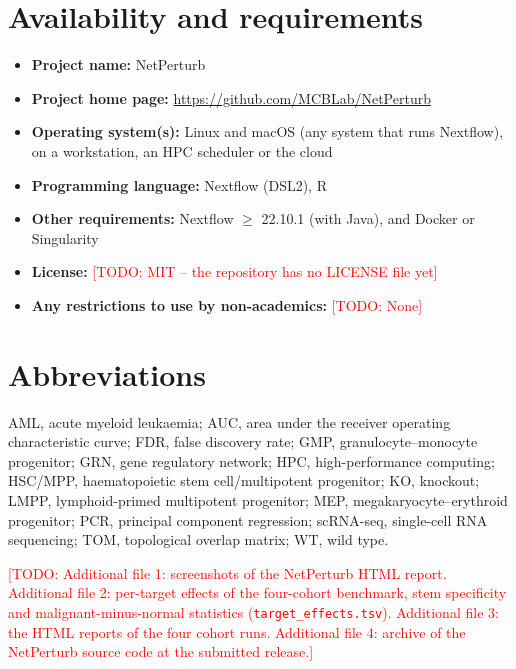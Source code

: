 \documentclass[pdflatex,sn-vancouver-num]{sn-jnl}%
\newcommand{\todo}[1]{\textcolor{red}{[TODO: #1]}}
\begin{document}
\section{Availability and requirements}\label{sec:availability}

\begin{itemize}
\item[] \textbf{Project name:} NetPerturb
\item[] \textbf{Project home page:} \url{https://github.com/MCBLab/NetPerturb}
\item[] \textbf{Operating system(s):} Linux and macOS (any system that runs Nextflow), on a workstation, an HPC scheduler or the cloud
\item[] \textbf{Programming language:} Nextflow (DSL2), R
\item[] \textbf{Other requirements:} Nextflow $\geq$ 22.10.1 (with Java), and Docker or Singularity
\item[] \textbf{License:} \todo{MIT -- the repository has no LICENSE file yet}
\item[] \textbf{Any restrictions to use by non-academics:} \todo{None}
\end{itemize}

\section{Abbreviations}\label{sec:abbreviations}

AML, acute myeloid leukaemia; AUC, area under the receiver operating characteristic curve; FDR, false discovery rate; GMP, granulocyte--monocyte progenitor; GRN, gene regulatory network; HPC, high-performance computing; HSC/MPP, haematopoietic stem cell/multipotent progenitor; KO, knockout; LMPP, lymphoid-primed multipotent progenitor; MEP, megakaryocyte--erythroid progenitor; PCR, principal component regression; scRNA-seq, single-cell RNA sequencing; TOM, topological overlap matrix; WT, wild type.

\backmatter

\todo{Additional file 1: screenshots of the NetPerturb HTML report. Additional file 2: per-target effects of the four-cohort benchmark, stem specificity and malignant-minus-normal statistics (\texttt{target\_effects.tsv}). Additional file 3: the HTML reports of the four cohort runs. Additional file 4: archive of the NetPerturb source code at the submitted release.}
\end{document}
